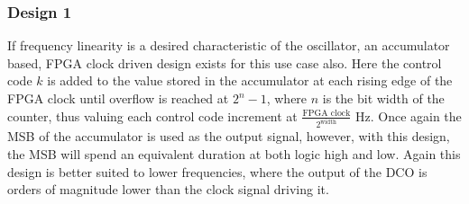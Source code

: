 \documentclass[conference]{IEEEtran}
\begin{document}

\subsubsection*{Design 1}
If frequency linearity is a desired characteristic of the oscillator, an accumulator based, FPGA clock driven design exists for this use case also. 
Here the control code $k$ is added to the value stored in the accumulator at each rising edge of the FPGA clock until overflow is reached at $2^n-1$, where $n$ is the bit width of the counter, thus valuing each control code increment at $\frac{\textrm{FPGA clock}}{2^{\textrm{width}}}$ Hz. Once again the MSB of the accumulator is used as the output signal, however, with this design, the MSB will spend an equivalent duration at both logic high and low.
Again this design is better suited to lower frequencies, where the output of the DCO is orders of magnitude lower than the clock signal driving it.
\end{document}
